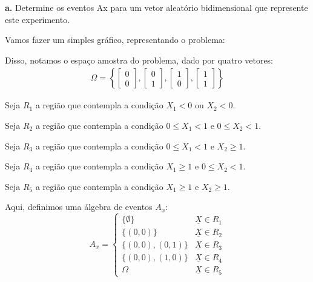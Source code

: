 \documentclass[a5paper]{report}
\begin{document}
\textbf{a.} Determine os eventos Ax para um vetor aleatório bidimensional que represente este experimento.

Vamos fazer um simples gráfico, representando o problema:

\begin{center}
\end{center}

Disso, notamos o espaço amostra do problema, dado por quatro vetores:
\begin{align*}
	\Omega = \left\{
	\begin{bmatrix}
		0\\
		0
	\end{bmatrix},
	\begin{bmatrix}
		0\\
		1
	\end{bmatrix},
	\begin{bmatrix}
		1\\
		0
	\end{bmatrix},
	\begin{bmatrix}
		1\\
		1
	\end{bmatrix}
	\right\}
\end{align*}

Seja $R_1$ a região que contempla a condição $X_1 < 0 \text{ ou } X_2 < 0$.

Seja $R_2$ a região que contempla a condição $0 \leq X_1 < 1 \text{ e } 0 \leq X_2 < 1$.

Seja $R_3$ a região que contempla a condição $0 \leq X_1 < 1 \text{ e } X_2 \geq 1$.

Seja $R_4$ a região que contempla a condição $X_1 \geq 1 \text{ e } 0 \leq X_2 < 1$.

Seja $R_5$ a região que contempla a condição $X_1 \geq 1 \text{ e } X_2 \geq 1$.

Aqui, definimos uma álgebra de eventos $A_x$:
\begin{equation*}
	A_x =
	\begin{cases}
		\{ \emptyset \} 			& \underline{X} \in R_1\\
		\{(0, 0)\} 					& \underline{X} \in R_2\\
		\{(0, 0), (0, 1)\}			& \underline{X} \in R_3\\
		\{(0, 0), (1, 0)\}			& \underline{X} \in R_4\\
		\Omega						& \underline{X} \in R_5
	\end{cases}
\end{equation*}
\end{document}
